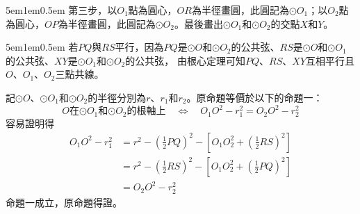 \documentclass[12pt]{article}
\begin{document}
\begin{mybox}[畫法 1-2]{5em}{1em}{0.5em}
    第三步，以$O_1$點為圓心，$OR$為半徑畫圓，此圓記為$\odot{O_1}$；以$O_2$點為圓心，$OP$為半徑畫圓，此圓記為$\odot{O_2}$。最後畫出$\odot{O_1}$和$\odot{O_2}$的交點$X$和$Y$。
    \begin{figure}[H]
        \centering
    \end{figure}
\end{mybox}\begin{mybox}[解答 1-2]{5em}{1em}{0.5em}
    若$PQ$與$RS$平行，因為$PQ$是$\odot{O}$和$\odot{O_2}$的公共弦、$RS$是$\odot{O}$和$\odot{O_1}$的公共弦、$XY$是$\odot{O_1}$和$\odot{O_2}$的公共弦，
    由根心定理可知$PQ$、$RS$、$XY$互相平行且$O$、$O_1$、$O_2$三點共線。

    記$\odot{O}$、$\odot{O_1}$和$\odot{O_2}$的半徑分別為$r$、$r_1$和$r_2$。原命題等價於以下的命題一：
    \begin{equation*}
        \text{$O$在$\odot{O_1}$和$\odot{O_2}$的根軸上}\quad\Leftrightarrow\quad O_1O^2-r_1^2=O_2O^2-r_2^2
    \end{equation*}
    容易證明得
    \begin{align*}
        O_1O^2-r_1^2&=r^2-\left(\frac{1}{2}PQ\right)^2-\left[O_1O_2^2+\left(\frac{1}{2}RS\right)^2\right]\\
        &=r^2-\left(\frac{1}{2}RS\right)^2-\left[O_1O_2^2+\left(\frac{1}{2}PQ\right)^2\right]\\
        &=O_2O^2-r_2^2
    \end{align*}
    命題一成立，原命題得證。
\end{mybox}
\end{document}
